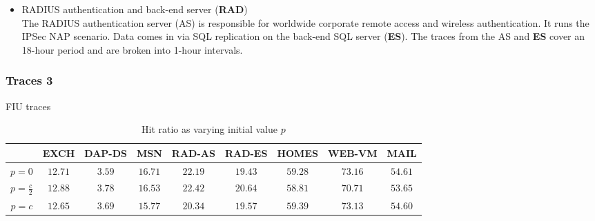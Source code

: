 \begin{itemize}
\item RADIUS authentication and back-end server (\textbf{RAD}) \\
 The RADIUS authentication server (AS) is responsible for
worldwide corporate remote access and wireless
authentication. It runs the IPSec NAP scenario. Data comes
in via SQL replication on the back-end SQL server (\textbf{ES}).
The traces from the AS and \textbf{ES} cover an 18-hour period and
are broken into 1-hour intervals.
\end{itemize}



\subsubsection{Traces 3} FIU traces

\begin{table*}[th]
    \captionsetup{font=normalsize}
    \normalsize
    \centering
    
        \begin{tabular}{|c|c|c|c|c|c|c|c|c|}

\hline
 &\textbf{EXCH} & \textbf{DAP-DS} & \textbf{MSN} & \textbf{RAD-AS} & \textbf{RAD-ES} & \textbf{HOMES} & \textbf{WEB-VM} & \textbf{MAIL} \\
\hline
\cline 

$p=0$ &           $12.71$ & $3.59$ & $16.71$ & $22.19$ & $19.43$ & $59.28$ & $73.16$ & $54.61$   \\ 
\hline
$p=\frac{c}{2}$ & $12.88$ & $ 3.78$ & $16.53 $ & $22.42 $ & $20.64 $ & $58.81 $ & $70.71 $ & $53.65 $ \\ 
\hline
$p=c$ &           $12.65$ & $3.69$ & $15.77$ & $20.34$ & $19.57$ & $59.39$ & $73.13$ & $54.60$ \\ 
\hline
        \end{tabular}
\caption{Hit ratio as varying initial value $p$}
\end{table*}

\vspace{0.2cm}


